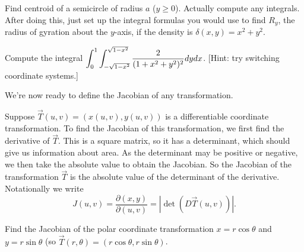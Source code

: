 \begin{problem}
Find centroid of a semicircle of radius $a$ ($y\geq 0$). Actually compute any integrals.  After doing this, just set up the integral formulas you would use to find $R_y$, the radius of gyration about the $y$-axis, if the density is $\delta(x,y)=x^2+y^2$. 
\end{problem}

\begin{problem}
Compute the integral $\displaystyle \int_{0}^{1}\int_{-\sqrt{1-x^2}}^{\sqrt{1-x^2}} \frac{2}{(1+x^2+y^2)^2}dydx$. [Hint: try switching coordinate systems.]
\end{problem}





We're now ready to define the Jacobian of any transformation.
\begin{definition}
 Suppose $\vec T(u,v)=(x(u,v),y(u,v))$ is a differentiable coordinate transformation. To find the Jacobian of this transformation, we first find the derivative of $\vec T$.  This is a square matrix, so it has a determinant, which should give us information about area. As the determinant may be positive or negative, we then take the absolute value to obtain the Jacobian.  So the Jacobian of the transformation $\vec T$ is the absolute value of the determinant of the derivative. 
 Notationally we write 
$$J(u,v) = \frac{\partial (x,y)}{\partial (u,v)} = |\det(D\vec T(u,v))|.$$
\end{definition}

\begin{problem}
 Find the Jacobian of the polar coordinate transformation $x=r\cos\theta$ and $y=r\sin\theta$ (so $\vec T(r,\theta)=(r\cos\theta,r\sin\theta)$.
\end{problem}

